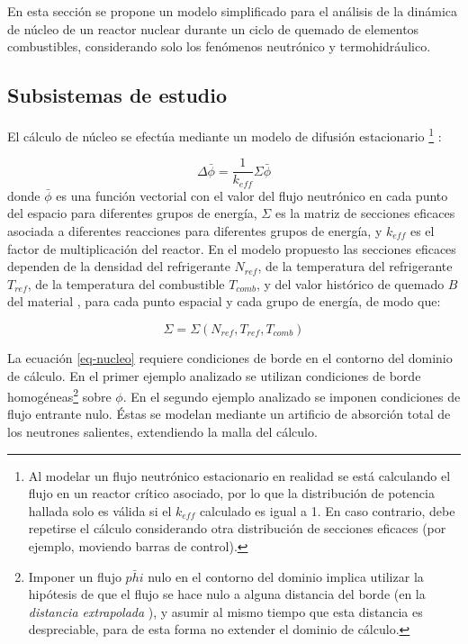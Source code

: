 En esta sección se propone un modelo simplificado para el análisis de la dinámica de núcleo de un reactor nuclear durante un ciclo de quemado de elementos combustibles,
considerando solo los fenómenos neutrónico y termohidráulico.

\subsection*{Subsistemas de estudio}
\label{3:subsistemas-nt}

El cálculo de núcleo se efectúa mediante un modelo de difusión estacionario
\footnote{Al modelar un flujo neutrónico estacionario en realidad se está calculando el flujo en un reactor crítico asociado,
por lo que la distribución de potencia hallada solo es válida si el $k_{eff}$ calculado es igual a 1.
En caso contrario, debe repetirse el cálculo considerando otra distribución de secciones eficaces
(por ejemplo, moviendo barras de control).
} \cite{henry}:

\begin{equation}
\Delta \bar{\phi} = \frac{1}{k_{eff}}\Sigma \bar{\phi}
\label{eq-nucleo}
\end{equation}
donde $\bar{\phi}$ es una función vectorial con el valor del flujo neutrónico en cada punto del espacio para diferentes grupos de energía,
$\Sigma$ es la matriz de secciones eficaces asociada a diferentes reacciones para diferentes grupos de energía,
y $k_{eff}$ es el factor de multiplicación del reactor.
En el modelo propuesto las secciones eficaces dependen de la densidad del refrigerante $N_{ref}$, de la temperatura del refrigerante $T_{ref}$, de la temperatura del combustible $T_{comb}$, 
y del valor histórico de quemado $B$ del material \cite{lamarsh},
para cada punto espacial y cada grupo de energía, de modo que:

\begin{equation}
\Sigma = \Sigma \left ( N_{ref}, T_{ref}, T_{comb} \right )
\label{eq-sigma}
\end{equation}

La ecuación \ref{eq-nucleo} requiere condiciones de borde en el contorno del dominio de cálculo.
En el primer ejemplo analizado se utilizan condiciones de borde homogéneas\footnote{
Imponer un flujo $\bar{phi}$ nulo en el contorno del dominio implica utilizar la hipótesis de que el flujo se hace nulo a alguna distancia del borde (en la \textit{distancia extrapolada} \cite{lamarsh}),
y asumir al mismo tiempo que esta distancia es despreciable, para de esta forma no extender el dominio de cálculo.
} sobre $\phi$.
En el segundo ejemplo analizado se imponen condiciones de flujo entrante nulo.
Éstas se modelan mediante un artificio de absorción total de los neutrones salientes, extendiendo la malla del cálculo.

